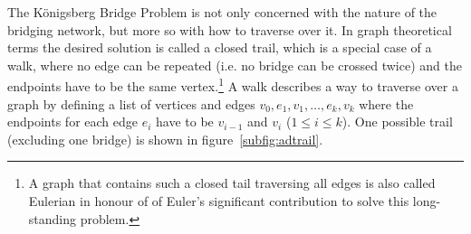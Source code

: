 The K\"onigsberg Bridge Problem is not only concerned with the nature of the
bridging network, but more so with how to traverse over it. In graph theoretical
terms the desired solution is called a closed trail, which is a special case of
a walk, where no edge can be repeated (i.e. no bridge can be crossed twice) and
the endpoints have to be the same
vertex.{\footnote{A graph that contains such a
closed tail traversing all edges is also called Eulerian in honour of of Euler's
significant contribution to solve this long-standing problem.}} A walk describes
a way to traverse over a graph by defining a list of vertices and edges
$v_0,e_1,v_1,\dots,e_k,v_k$ where the endpoints for each edge $e_i$ have to be
$v_{i-1}$ and $v_i$ ($1\leq i\leq k$). One possible trail (excluding one bridge)
is shown in figure~\ref{subfig:adtrail}. 
%
